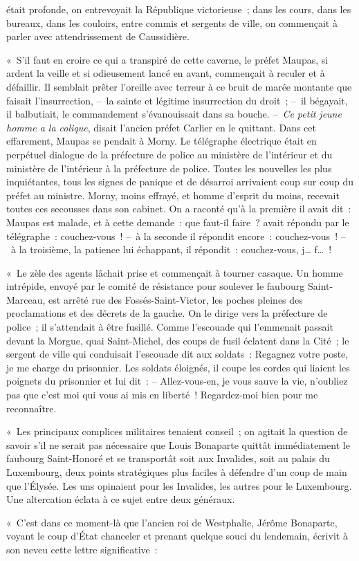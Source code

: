 \documentclass[french,twoside]{book} %
\begin{document}
était profonde, on entrevoyait la République victorieuse ; dans les cours, dans les bureaux, dans les couloirs, entre commis et sergents de ville, on commençait à parler avec attendrissement de Caussidière.\par
« S’il faut en croire ce qui a transpiré de cette caverne, le préfet Maupas, si ardent la veille et si odieusement lancé en avant, commençait à reculer et à défaillir. Il semblait prêter l’oreille avec terreur à ce bruit de marée montante que faisait l’insurrection, – la sainte et légitime insurrection du droit ; – il bégayait, il balbutiait, le commandement s’évanouissait dans sa bouche. – \emph{Ce petit jeune homme a la colique}, disait l’ancien préfet Carlier en le quittant. Dans cet effarement, Maupas se pendait à Morny. Le télégraphe électrique était en perpétuel dialogue de la préfecture de police au ministère de l’intérieur et du ministère de l’intérieur à la préfecture de police. Toutes les nouvelles les plus inquiétantes, tous les signes de panique et de désarroi arrivaient coup sur coup du préfet au ministre. Morny, moins effrayé, et homme d’esprit du moins, recevait toutes ces secousses dans son cabinet. On a raconté qu’à la première il avait dit : Maupas est malade, et à cette demande : que faut-il faire ? avait répondu par le télégraphe : couchez-vous ! – à la seconde il répondit encore : couchez-vous ! – à la troisième, la patience lui échappant, il répondit : couchez-vous, j… f… !\par
« Le zèle des agents lâchait prise et commençait à tourner casaque. Un homme intrépide, envoyé par le comité de résistance pour soulever le faubourg Saint-Marceau, est arrêté rue des Fossés-Saint-Victor, les poches pleines des proclamations et des décrets de la gauche. On le dirige vers la préfecture de police ; il s’attendait à être fusillé. Comme l’escouade qui l’emmenait passait devant la Morgue, quai Saint-Michel, des coups de fusil éclatent dans la Cité ; le sergent de ville qui conduisait l’escouade dit aux soldats : Regagnez votre poste, je me charge du prisonnier. Les soldats éloignés, il coupe les cordes qui liaient les poignets du prisonnier et lui dit : – Allez-vous-en, je vous sauve la vie, n’oubliez pas que c’est moi qui vous ai mis en liberté ! Regardez-moi bien pour me reconnaître.\par
« Les principaux complices militaires tenaient conseil ; on agitait la question de savoir s’il ne serait pas nécessaire que Louis Bonaparte quittât immédiatement le faubourg Saint-Honoré et se transportât soit aux Invalides, soit au palais du Luxembourg, deux points stratégiques plus faciles à défendre d’un coup de main que l’Élysée. Les uns opinaient pour les Invalides, les autres pour le Luxembourg. Une altercation éclata à ce sujet entre deux généraux.\par
« C’est dans ce moment-là que l’ancien roi de Westphalie, Jérôme Bonaparte, voyant le coup d’État chanceler et prenant quelque souci du lendemain, écrivit à son neveu cette lettre significative :\par
\end{document}
